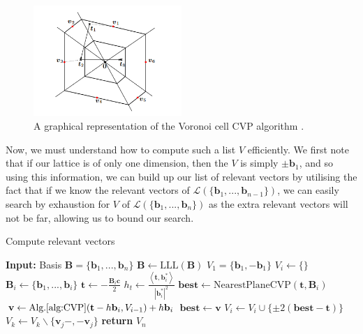 \documentclass[a4paper, 10pt]{article}
\theoremstyle{definition}
\begin{document}
\begin{figure}[h]
    \centering
    \includegraphics[width = 0.5\textwidth]{voronoi_cells.png}
    \caption{A graphical representation of the Voronoi cell \ac{CVP} algorithm \cite{10.1007/978-3-642-20901-7_10}.}
\end{figure}

Now, we must understand how to compute such a list $V$ efficiently. We first note that if our lattice is of only one dimension, then the $V$ is simply $\pm \mathbf{b}_1$, and so using this information, we can build up our list of relevant vectors by utilising the fact that if we know the relevant vectors of $\mathcal{L}(\{\mathbf{b}_1,...,\mathbf{b}_{n-1}\})$, we can easily search by exhaustion for $V$ of $\mathcal{L}(\{\mathbf{b}_1,...,\mathbf{b}_{n}\})$ as the extra relevant vectors will not be far, allowing us to bound our search.


\begin{algorithm}[H]
    \caption{Compute relevant vectors}
    \begin{algorithmic}[1]
    \State \textbf{Input:} Basis $\mathbf{B} = \{\mathbf{b}_1,...,\mathbf{b}_n\}$
    \State $\mathbf{B} \gets \mbox{LLL}(\mathbf{B})$
    \State $V_1 = \{\mathbf{b}_1, -\mathbf{b}_1\}$
        \State $V_i \gets \{\}$
        \State $\mathbf{B}_i \gets \{\mathbf{b}_1,...,\mathbf{b}_i\}$
            \State $\mathbf{t} \gets -\frac{\mathbf{B}_i\mathbf{c}}{2}$
            \State $h_t \gets \frac{\left\langle \mathbf{t},\mathbf{b}^*_i\right\rangle }{|\mathbf{b}^*_i|^2}$
            \State $\mathbf{best} \gets \mbox{NearestPlaneCVP}(\mathbf{t}, \mathbf{B}_i)$
                \State $\mathbf{v} \gets \mbox{Alg.\ref{alg:CVP}}(\mathbf{t}-h\mathbf{b}_i, V_{i-1}) + h\mathbf{b}_i$
                    \State $\mathbf{best} \gets \mathbf{v}$
                \EndIf
            \EndFor
            \State $V_i \gets V_i \cup \{\pm 2(\mathbf{best} - \mathbf{t})\}$
        \EndFor
                \State $V_k \gets V_k \backslash \{\mathbf{v}_j-, -\mathbf{v}_j\}$
            \EndIf
        \EndFor
    \EndFor
    \State \textbf{return} $V_n$
    \end{algorithmic}
\end{algorithm}
\end{document}
